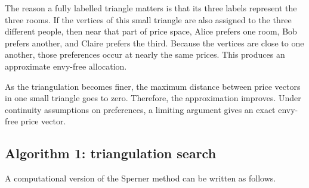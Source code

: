 \documentclass[11pt]{article}
\begin{document}
The reason a fully labelled triangle matters is that its three labels represent the three rooms. If the vertices of this small triangle are also assigned to the three different people, then near that part of price space, Alice prefers one room, Bob prefers another, and Claire prefers the third. Because the vertices are close to one another, those preferences occur at nearly the same prices. This produces an approximate envy-free allocation.

As the triangulation becomes finer, the maximum distance between price vectors in one small triangle goes to zero. Therefore, the approximation improves. Under continuity assumptions on preferences, a limiting argument gives an exact envy-free price vector.

\subsection{Algorithm 1: triangulation search}

A computational version of the Sperner method can be written as follows.

\begin{center}
\end{center}
\end{document}
